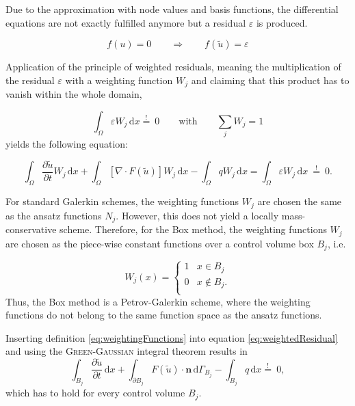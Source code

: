 Due to the approximation with node values and basis functions, the differential equations are not exactly fulfilled anymore but a residual $\varepsilon$ is produced.

\begin{equation}
  f(u) = 0  \qquad \Rightarrow \qquad f(\tilde u) = \varepsilon
\end{equation}

Application of the principle of weighted residuals, meaning the multiplication
of the residual $\varepsilon$ with a weighting function $W_j$  and claiming that
this product has to vanish within the whole domain,

\begin{equation}
  \int_\Omega \varepsilon W_j \, \mathrm{d}x \overset {!}{=} \: 0 \qquad \textrm{with} \qquad \sum_j W_j =1
\end{equation}
yields the following equation:

\begin{equation}
  \int_\Omega \frac{\partial \tilde u}{\partial t} W_j \, \mathrm{d}x + \int_\Omega
   \left[ \nabla \cdot F(\tilde u) \right] W_j  \, \mathrm{d}x - \int_\Omega q W_j \, \mathrm{d}x = \int_\Omega \varepsilon W_j \, \mathrm{d}x \: \overset {!}{=} \: 0.
\label{eq:weightedResidual}
\end{equation}

For standard Galerkin schemes, the weighting functions $W_j$ are chosen the same as the ansatz functions $N_j$. However, this does not yield a locally mass-conservative scheme.
Therefore, for the Box method, the weighting functions $W_j$ are chosen as
the piece-wise constant functions over a
control volume box $B_j$, i.e.

\begin{equation}
  W_j(x) = \begin{cases}
            1 &x \in B_j \\
      0 &x \notin B_j.\\
           \end{cases}
\label{eq:weightingFunctions}
\end{equation}
Thus, the Box method is a Petrov-Galerkin scheme, where the weighting functions do not belong to the same function space as the ansatz functions.

Inserting definition \eqref{eq:weightingFunctions} into equation \eqref{eq:weightedResidual} and using the \textsc{Green-Gaussian} integral theorem results in
\begin{equation}
  \int_{B_j} \frac{\partial \tilde u}{\partial t} \, \mathrm{d}x + \int_{\partial B_j}  F(\tilde u) \cdot \mathbf n \, \mathrm{d}\Gamma_{B_j} - \int_{B_j} q \, \mathrm{d}x  \overset {!}{=} \: 0,
\label{eq:BoxMassBlance}
\end{equation}
which has to hold for every control volume $B_j$.

